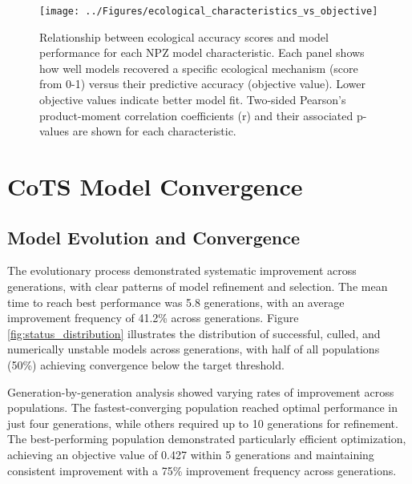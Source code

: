 \begin{figure}[H]
\centering
\texttt{[image: ../Figures/ecological\_characteristics\_vs\_objective]}
\caption{Relationship between ecological accuracy scores and model performance for each NPZ model characteristic. Each panel shows how well models recovered a specific ecological mechanism (score from 0-1) versus their predictive accuracy (objective value). Lower objective values indicate better model fit. Two-sided Pearson's product-moment correlation coefficients (r) and their associated p-values are shown for each characteristic.}
\label{fig:ecological_characteristics}
\end{figure}



\section{CoTS Model Convergence}
\label{sec:convergence}

    
\subsection{Model Evolution and Convergence}

The evolutionary process demonstrated systematic improvement across generations, with clear patterns of model refinement and selection. The mean time to reach best performance was 5.8 generations, with an average improvement frequency of 41.2\% across generations. Figure \ref{fig:status_distribution} illustrates the distribution of successful, culled, and numerically unstable models across generations, with half of all populations (50\%) achieving convergence below the target threshold. 

Generation-by-generation analysis showed varying rates of improvement across populations. The fastest-converging population reached optimal performance in just four generations, while others required up to 10 generations for refinement. The best-performing population demonstrated particularly efficient optimization, achieving an objective value of 0.427 within 5 generations and maintaining consistent improvement with a 75\% improvement frequency across generations.

